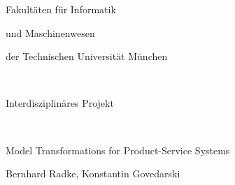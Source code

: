 \frontmatter
\pagestyle{empty}

\begin{center}
\begin{Huge}
Fakult\"aten f\"ur Informatik 
\end{Huge}
\vspace{0.3in}
\begin{Huge}
und Maschinenwesen
\end{Huge}

\vspace{0.4in}
\begin{huge}
der Technischen Universit\"at M\"unchen
\end{huge}\\
\vspace{4cm}
\begin{LARGE}
Interdisziplin\"ares Projekt
\vspace{4cm}
\end{LARGE}\\


\begin{Huge}
Model Transformations for Product-Service Systems
\vspace{3cm}

\end{Huge}
\begin{LARGE}
Bernhard Radke, Konstantin Govedarski \vspace{0.6in}
\end{LARGE}
%
%
\end{center}